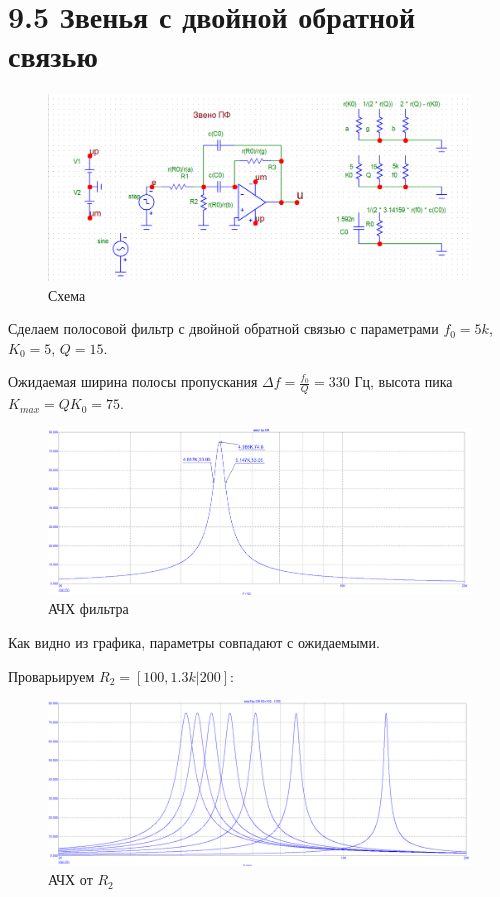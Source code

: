 \documentclass[12pt,a4paper]{article}
\begin{document}
	\section*{9.5 Звенья с двойной обратной связью}
	
	\begin{figure}[H]
		\centering
		\includegraphics[width=1.0\linewidth]{res/amp1bp_scheme.png}
		\caption{Схема}
		\label{scheme}
	\end{figure}

	Сделаем полосовой фильтр с двойной обратной связью с параметрами $f_0 = 5k$, $K_0 = 5$, $Q = 15$.
	
	Ожидаемая ширина полосы пропускания $\Delta f = \frac{f_0}{Q} = 330$ Гц, высота пика $K_{max} = QK_0 = 75$.
	
	\begin{figure}[H]
		\centering
		\includegraphics[width=1.0\linewidth]{res/amp1bp_ach.png}
		\caption{АЧХ фильтра}
		\label{ach}
	\end{figure}
	
	Как видно из графика, параметры совпадают с ожидаемыми.
	
	Проварьируем $R_2= [100, 1.3k | 200]$:
	\begin{figure}[H]
		\centering
		\includegraphics[width=1.0\linewidth]{res/amp1bp_R2.png}
		\caption{АЧХ от $R_2$}
		\label{ach}
	\end{figure}
\end{document}
